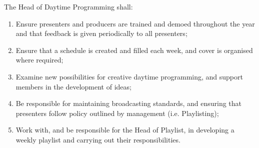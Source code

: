 \item The Head of Daytime Programming shall:
\begin{enumerate}[label*=\arabic*.]
    \item Ensure presenters and producers are trained and demoed throughout the year and that feedback is given periodically to all presenters;
    \item Ensure that a schedule is created and filled each week, and cover is organised where required;
    \item Examine new possibilities for creative daytime programming, and support members in the development of ideas;
    \item Be responsible for maintaining broadcasting standards, and ensuring that presenters follow policy outlined by management (i.e. Playlisting);
    \item Work with, and be responsible for the Head of Playlist, in developing a weekly playlist and carrying out their responsibilities.
\end{enumerate}
